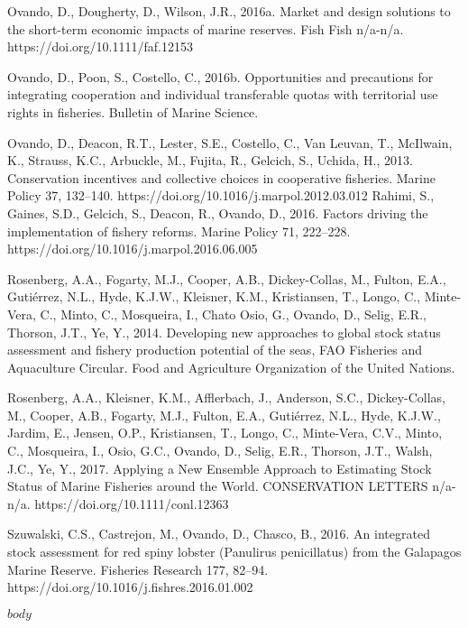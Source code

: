 \documentclass[twoside,12pt,final]{ucthesis-CA2012}
\begin{document}
\begin{ucfrontmatter}
\begin{vitae}
Ovando, D., Dougherty, D., Wilson, J.R., 2016a. Market and design solutions to the short-term economic impacts of marine reserves. Fish Fish n/a-n/a. https://doi.org/10.1111/faf.12153

Ovando, D., Poon, S., Costello, C., 2016b. Opportunities and precautions for integrating cooperation and individual transferable quotas with territorial use rights in fisheries. Bulletin of Marine Science.

Ovando, D., Deacon, R.T., Lester, S.E., Costello, C., Van Leuvan, T., McIlwain, K., Strauss, K.C., Arbuckle, M., Fujita, R., Gelcich, S., Uchida, H., 2013. Conservation incentives and collective choices in cooperative fisheries. Marine Policy 37, 132–140. https://doi.org/10.1016/j.marpol.2012.03.012
Rahimi, S., Gaines, S.D., Gelcich, S., Deacon, R., Ovando, D., 2016. Factors driving the implementation of fishery reforms. Marine Policy 71, 222–228. https://doi.org/10.1016/j.marpol.2016.06.005

Rosenberg, A.A., Fogarty, M.J., Cooper, A.B., Dickey-Collas, M., Fulton, E.A., Gutiérrez, N.L., Hyde, K.J.W., Kleisner, K.M., Kristiansen, T., Longo, C., Minte-Vera, C., Minto, C., Mosqueira, I., Chato Osio, G., Ovando, D., Selig, E.R., Thorson, J.T., Ye, Y., 2014. Developing new approaches to global stock status assessment and fishery production potential of the seas, FAO Fisheries and Aquaculture Circular. Food and Agriculture Organization of the United Nations.

Rosenberg, A.A., Kleisner, K.M., Afflerbach, J., Anderson, S.C., Dickey-Collas, M., Cooper, A.B., Fogarty, M.J., Fulton, E.A., Gutiérrez, N.L., Hyde, K.J.W., Jardim, E., Jensen, O.P., Kristiansen, T., Longo, C., Minte-Vera, C.V., Minto, C., Mosqueira, I., Osio, G.C., Ovando, D., Selig, E.R., Thorson, J.T., Walsh, J.C., Ye, Y., 2017. Applying a New Ensemble Approach to Estimating Stock Status of Marine Fisheries around the World. CONSERVATION LETTERS n/a-n/a. https://doi.org/10.1111/conl.12363

Szuwalski, C.S., Castrejon, M., Ovando, D., Chasco, B., 2016. An integrated stock assessment for red spiny lobster (Panulirus penicillatus) from the Galapagos Marine Reserve. Fisheries Research 177, 82–94. https://doi.org/10.1016/j.fishres.2016.01.002


  \end{vitae}
  \begin{abstract}

    $abstract$

  \end{abstract}
	\tableofcontents
\end{ucfrontmatter}

\begin{ucmainmatter}

$body$

\end{ucmainmatter}
\end{document}

